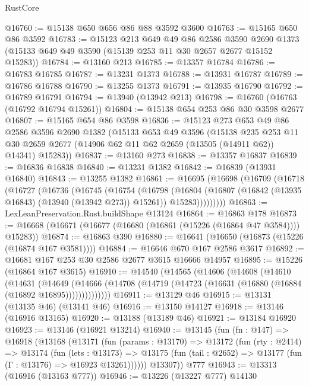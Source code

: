 \begin{lexlean}{RustCore}
\begin{coremodule}
@16760 := @15138 @650 @656 @86 @88 @3592 @3600
@16763 := @15165 @650 @86 @3592
@16783 := @15123
    @213
    @649
    @49
    @86
    @2586
    @3590
    @2690
    @1373
    (@15133 @649 @49 @3590 (@15139 @253 @11 @30 @2657 @2677 @15152 @15283))
@16784 := @13160 @213
@16785 := @13357 @16784
@16786 := @16783 @16785
@16787 := @13231 @1373
@16788 := @13931 @16787
@16789 := @16786 @16788
@16790 := @13255 @1373
@16791 := @13935 @16790
@16792 := @16789 @16791
@16794 := @13940 (@13942 @213)
@16798 := @16760 (@16763 (@16792 @16794 @15261))
@16804 := @15138 @654 @253 @86 @30 @3598 @2677
@16807 := @15165 @654 @86 @3598
@16836 := @15123
    @273
    @653
    @49
    @86
    @2586
    @3596
    @2690
    @1382
    (@15133
      @653
      @49
      @3596
      (@15138
        @235
        @253
        @11
        @30
        @2659
        @2677
        (@14906 @62 @11 @62 @2659 (@13505 (@14911 @62)) @14341)
        @15283))
@16837 := @13160 @273
@16838 := @13357 @16837
@16839 := @16836 @16838
@16840 := @13231 @1382
@16842 := @16839 (@13931 @16840)
@16843 := @13255 @1382
@16861 := @16695
    (@16698
      (@16709
        (@16718
          (@16727
            (@16736
              (@16745
                (@16754
                  (@16798
                    (@16804
                      (@16807 (@16842 (@13935 @16843) (@13940 (@13942 @273)) @15261))
                      @15283)))))))))
@16863 := LexLeanPreservation.Rust.buildShape @13124
@16864 := @16863 @178
@16873 := @16668 (@16671 (@16677 (@16680 (@16861 (@15226 (@16864 @47 @3584)))) @15283))
@16874 := @16863 @390
@16880 := @16641 (@16650 (@16873 (@15226 (@16874 @167 @3581))))
@16884 := @16646 @670 @167 @2586 @3617
@16892 := @16681 @167 @253 @30 @2586 @2677 @3615 @16666 @14957
@16895 := @15226 (@16864 @167 @3615)
@16910 := @14540
    (@14565
      (@14606
        (@14608
          (@14610
            (@14631
              (@14649
                (@14666 (@14708 (@14719 (@14723 (@16631 (@16880 (@16884 (@16892 @16895))))))))))))))
@16911 := @13129 @46
@16915 := @13131 (@13135 @46) (@13141 @46)
@16916 := @13150 @14127
@16918 := @13146 (@16916 @13165)
@16920 := @13188 (@13189 @46)
@16921 := @13184 @16920
@16923 := @13146 (@16921 @13214)
@16940 := @13145
    (fun (fn : @147) =>
    @16918
      (@13168
        (@13171
          (fun (params : @13170) =>
          @13172
            (fun (rty : @2414) =>
            @13174
              (fun (lets : @13173) =>
              @13175 (fun (tail : @2652) => @13177 (fun (Γ : @13176) => @16923 @13261))))))
        @13307))
    @777
@16943 := @13313 (@16916 (@13163 @777))
@16946 := @13226 (@13227 @777) @14130

\end{coremodule}
\end{lexlean}
